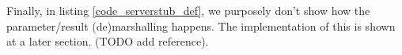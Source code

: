 Finally, in listing \ref{code_serverstub_def}, we purposely don't show how the parameter/result (de)marshalling happens. The implementation of this is shown at a later section. (TODO add reference). 


